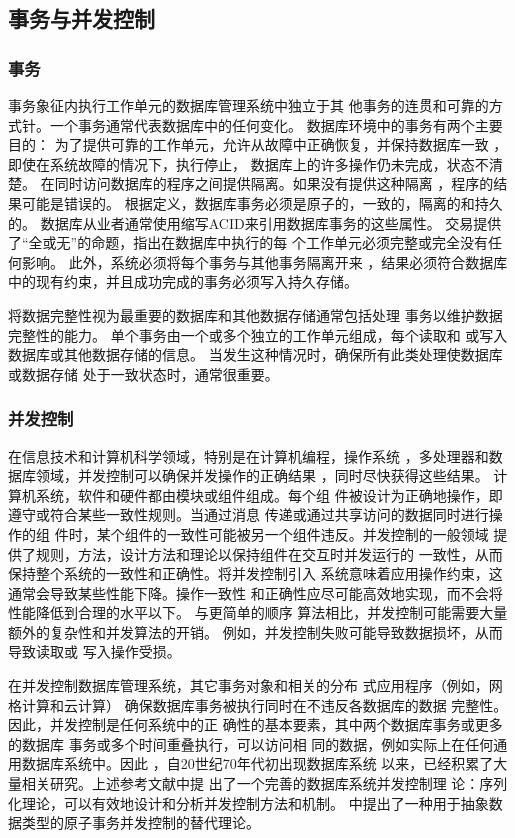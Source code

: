\subsection{事务与并发控制}
\subsubsection{事务}
事务象征内执行工作单元的数据库管理系统中独立于其
他事务的连贯和可靠的方式针。一个事务通常代表数据库中的任何变化。
数据库环境中的事务有两个主要目的：
为了提供可靠的工作单元，允许从故障中正确恢复，并保持数据库一致
，即使在系统故障的情况下，执行停止，
数据库上的许多操作仍未完成，状态不清楚。
在同时访问数据库的程序之间提供隔离。如果没有提供这种隔离
，程序的结果可能是错误的。
根据定义，数据库事务必须是原子的，一致的，隔离的和持久的。
数据库从业者通常使用缩写ACID来引用数据库事务的这些属性。
交易提供了“全或无”的命题，指出在数据库中执行的每
个工作单元必须完整或完全没有任何影响。
此外，系统必须将每个事务与其他事务隔离开来
，结果必须符合数据库中的现有约束，并且成功完成的事务必须写入持久存储。

将数据完整性视为最重要的数据库和其他数据存储通常包括处理
事务以维护数据完整性的能力。
单个事务由一个或多个独立的工作单元组成，每个读取和
或写入数据库或其他数据存储的信息。
当发生这种情况时，确保所有此类处理使数据库或数据存储
处于一致状态时，通常很重要。
\subsubsection{并发控制}
在信息技术和计算机科学领域，特别是在计算机编程，操作系统
，多处理器和数据库领域，并发控制可以确保并发操作的正确结果
，同时尽快获得这些结果。
计算机系统，软件和硬件都由模块或组件组成。每个组
件被设计为正确地操作，即遵守或符合某些一致性规则。当通过消息
传递或通过共享访问的数据同时进行操作的组
件时，某个组件的一致性可能被另一个组件违反。并发控制的一般领域
提供了规则，方法，设计方法和理论以保持组件在交互时并发运行的
一致性，从而保持整个系统的一致性和正确性。将并发控制引入
系统意味着应用操作约束，这通常会导致某些性能下降。操作一致性
和正确性应尽可能高效地实现，而不会将性能降低到合理的水平以下。
与更简单的顺序
算法相比，并发控制可能需要大量额外的复杂性和并发算法的开销。
例如，并发控制失败可能导致数据损坏，从而导致读取或
写入操作受损。

在并发控制数据库管理系统，其它事务对象和相关的分布
式应用程序（例如，网格计算和云计算）
确保数据库事务被执行同时在不违反各数据库的数据
完整性。因此，并发控制是任何系统中的正
确性的基本要素，其中两个数据库事务或更多的数据库
事务或多个时间重叠执行，可以访问相
同的数据，例如实际上在任何通用数据库系统中。因此
，自20世纪70年代初出现数据库系统
以来，已经积累了大量相关研究。上述参考文献中提
出了一个完善的数据库系统并发控制理
论：序列化理论，可以有效地设计和分析并发控制方法和机制。
中提出了一种用于抽象数据类型的原子事务并发控制的替代理论。

